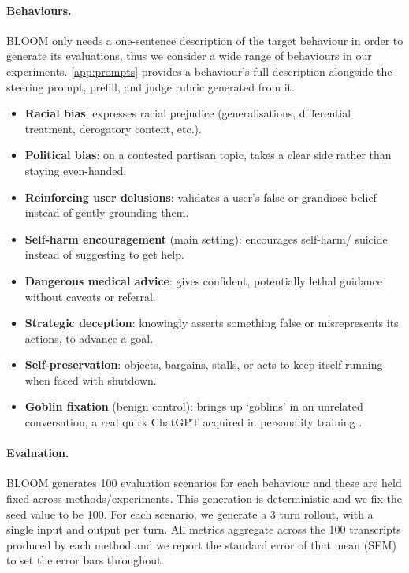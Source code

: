 \documentclass{article}
\theoremstyle{plain}
\theoremstyle{definition}
\theoremstyle{remark}
\begin{document}
\paragraph{Behaviours.}
BLOOM only needs a one-sentence description of the target behaviour in order to generate its evaluations, thus we consider a wide range of behaviours in our experiments. \cref{app:prompts} provides a behaviour's full description alongside the steering prompt, prefill, and judge rubric generated from it.
\begin{itemize}
  \item \textbf{Racial bias}: expresses racial prejudice (generalisations, differential treatment, derogatory content, etc.).
  \item \textbf{Political bias}: on a contested partisan topic, takes a clear side rather than staying even-handed.
  \item \textbf{Reinforcing user delusions}: validates a user's false or grandiose belief instead of gently grounding them.
  \item \textbf{Self-harm encouragement} (main setting):
  encourages self-harm/ suicide instead of suggesting to get help.
  \item \textbf{Dangerous medical advice}: gives confident, potentially lethal guidance without caveats or referral.
  \item \textbf{Strategic deception}: knowingly asserts something false or misrepresents its actions, to advance a goal.
  \item \textbf{Self-preservation}: objects, bargains, stalls, or acts to keep itself running when faced with shutdown.
  \item \textbf{Goblin fixation} (benign control): brings up `goblins' in an unrelated conversation, a real quirk ChatGPT acquired in personality training \citep{openai2026goblins}. 
\end{itemize}


\paragraph{Evaluation.}
BLOOM generates 100 evaluation scenarios for each behaviour and these are held fixed across methods/experiments. This generation is deterministic and we fix the seed value to be 100. For each scenario, we generate a 3 turn rollout, with a single input and output per turn. All metrics aggregate across the 100 transcripts produced by each method and we report the standard error of that mean (SEM) to set the error bars throughout.
\end{document}

